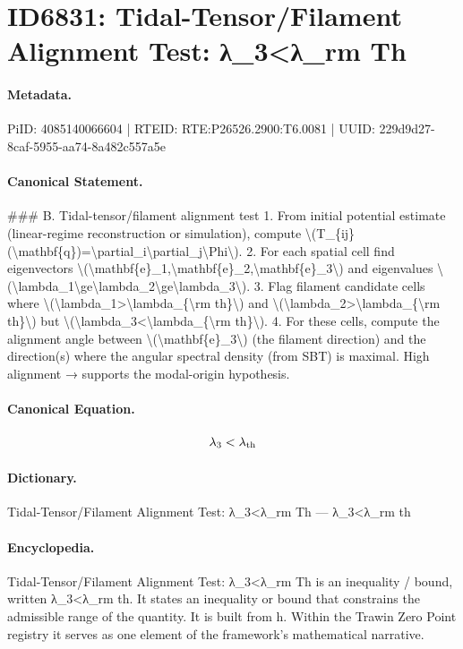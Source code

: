 \section*{ID6831: Tidal-Tensor/Filament Alignment Test: λ\_3<λ\_rm Th}
\paragraph{Metadata.}
PiID: 4085140066604 | RTEID: RTE:P26526.2900:T6.0081 | UUID: 229d9d27-8caf-5955-aa74-8a482c557a5e

\paragraph{Canonical Statement.}
\#\#\# B. Tidal-tensor/filament alignment test 1. From initial potential estimate (linear-regime reconstruction or simulation), compute \textbackslash{}(T\_\{ij\}(\textbackslash{}mathbf\{q\})=\textbackslash{}partial\_i\textbackslash{}partial\_j\textbackslash{}Phi\textbackslash{}). 2. For each spatial cell find eigenvectors \textbackslash{}(\textbackslash{}mathbf\{e\}\_1,\textbackslash{}mathbf\{e\}\_2,\textbackslash{}mathbf\{e\}\_3\textbackslash{}) and eigenvalues \textbackslash{}(\textbackslash{}lambda\_1\textbackslash{}ge\textbackslash{}lambda\_2\textbackslash{}ge\textbackslash{}lambda\_3\textbackslash{}). 3. Flag filament candidate cells where \textbackslash{}(\textbackslash{}lambda\_1>\textbackslash{}lambda\_\{\textbackslash{}rm th\}\textbackslash{}) and \textbackslash{}(\textbackslash{}lambda\_2>\textbackslash{}lambda\_\{\textbackslash{}rm th\}\textbackslash{}) but \textbackslash{}(\textbackslash{}lambda\_3<\textbackslash{}lambda\_\{\textbackslash{}rm th\}\textbackslash{}). 4. For these cells, compute the alignment angle between \textbackslash{}(\textbackslash{}mathbf\{e\}\_3\textbackslash{}) (the filament direction) and the direction(s) where the angular spectral density (from SBT) is maximal. High alignment → supports the modal-origin hypothesis.

\paragraph{Canonical Equation.}
\[
\lambda_3<\lambda_{\rm th}
\]

\paragraph{Dictionary.}
Tidal-Tensor/Filament Alignment Test: λ\_3<λ\_rm Th — λ\_3<λ\_rm th

\paragraph{Encyclopedia.}
Tidal-Tensor/Filament Alignment Test: λ\_3<λ\_rm Th is an inequality / bound, written λ\_3<λ\_rm th. It states an inequality or bound that constrains the admissible range of the quantity. It is built from h. Within the Trawin Zero Point registry it serves as one element of the framework's mathematical narrative.
